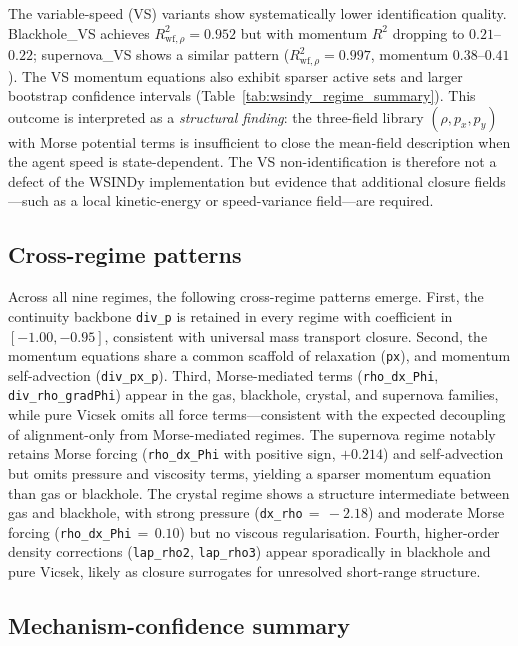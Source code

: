The variable-speed (VS) variants show systematically lower identification
quality.  Blackhole\_VS achieves $R^2_{\text{wf},\rho}=0.952$ but with
momentum $R^2$ dropping to $0.21$--$0.22$; supernova\_VS shows a similar
pattern ($R^2_{\text{wf},\rho}=0.997$, momentum $0.38$--$0.41$).
The VS momentum equations also exhibit sparser active sets and larger
bootstrap confidence intervals
(Table~\ref{tab:wsindy_regime_summary}).
This outcome is interpreted as a \emph{structural finding}: the three-field
library $(\rho, p_x, p_y)$ with Morse potential terms is insufficient to
close the mean-field description when the agent speed is state-dependent.
The VS non-identification is therefore not a defect of the WSINDy
implementation but evidence that additional closure fields---such as a
local kinetic-energy or speed-variance field---are required.

\subsection{Cross-regime patterns}
\label{subsec:outcomes_patterns}

Across all nine regimes, the following cross-regime patterns
emerge.  First, the continuity backbone \texttt{div\_p} is retained in
every regime with coefficient in $[-1.00, -0.95]$, consistent with
universal mass transport closure.  Second, the momentum equations share a common
scaffold of relaxation (\texttt{px}), and
momentum self-advection (\texttt{div\_px\_p}).  Third, Morse-mediated
terms (\texttt{rho\_dx\_Phi}, \texttt{div\_rho\_gradPhi}) appear
in the gas, blackhole, crystal, and supernova families, while pure Vicsek omits all
force terms---consistent with the expected decoupling of alignment-only
from Morse-mediated regimes.  The supernova regime notably retains
Morse forcing (\texttt{rho\_dx\_Phi} with positive sign, $+0.214$) and
self-advection but omits pressure and viscosity terms, yielding a sparser
momentum equation than gas or blackhole.  The crystal regime shows a
structure intermediate between gas and blackhole, with strong pressure
(\texttt{dx\_rho}$\,{=}\,{-}2.18$) and moderate Morse
forcing (\texttt{rho\_dx\_Phi}$\,{=}\,0.10$) but no viscous regularisation.
Fourth, higher-order density corrections
(\texttt{lap\_rho2}, \texttt{lap\_rho3}) appear sporadically in blackhole
and pure Vicsek, likely as closure surrogates for unresolved short-range
structure.

\subsection{Mechanism-confidence summary}
\label{subsec:mechanism_confidence}

